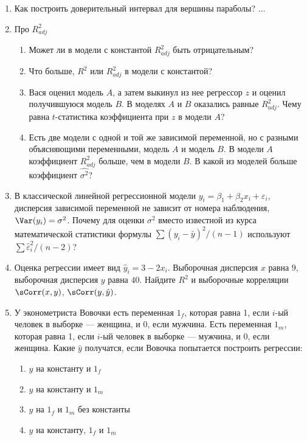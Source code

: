 \documentclass[pdftex,12pt,a4paper]{article}
\def \hy{\hat{y}}
\def \he{\hat{\varepsilon}}
\def \e{\varepsilon}
\newcommand{\solution}[1]{}
\begin{document}
\begin{enumerate}
\item Как построить доверительный интервал для вершины параболы? ...
\solution{bootstrap, дельта-метод}

\item Про $R^2_{adj}$
\begin{enumerate}
\item Может ли в модели с константой $R^2_{adj}$ быть отрицательным?
\item Что больше, $R^2$ или $R^2_{adj}$ в модели с константой?
\item Вася оценил модель $A$, а затем выкинул из нее регрессор $z$ и оценил получившуюся модель $B$. В моделях $A$ и $B$ оказались равные $R^2_{adj}$. Чему равна $t$-статистика коэффициента при $z$ в модели $A$?
\item Есть две модели с одной и той же зависимой переменной, но с разными объясняющими переменными, модель $A$ и модель $B$. В модели $A$ коэффициент $R^2_{adj}$ больше, чем в модели $B$. В какой из моделей больше коэффициент $\hat{\sigma^2}$? 
\end{enumerate}
\solution{да, $R^2$, $t=1$, $B$ }


\item В классической линейной регрессионной модели $y_i=\beta_1+\beta_2 x_i+\e_i$, дисперсия зависимой переменной не зависит от номера наблюдения, $\Var(y_i)=\sigma^2$. Почему для оценки $\sigma^2$ вместо известной из курса математической статистики формулы $\sum (y_i-\bar{y})^2/(n-1)$ используют $\sum \he_i^2/(n-2)$?
\solution{формула $\sum (y_i-\bar{y})^2/(n-1)$ неприменима так как $\E(y_i)$ не является константой }


\item Оценка регрессии имеет вид $\hy_i=3-2x_i$. Выборочная дисперсия $x$ равна $9$, выборочная дисперсия $y$ равна $40$. Найдите $R^2$ и выборочные корреляции $\sCorr(x,y)$, $\sCorr(y,\hy)$.
\solution{$R^2$ --- это отношение выборочных дисперсий $\hy$ и $y$. } 

\item У эконометриста Вовочки есть переменная $1_f$, которая равна 1, если $i$-ый человек в выборке --- женщина, и 0, если мужчина. Есть переменная $1_m$, которая равна 1, если $i$-ый человек в выборке --- мужчина, и 0, если женщина. Какие $\hy$ получатся, если Вовочка попытается построить регрессии:
\begin{enumerate}
\item $y$ на константу и $1_f$
\item $y$ на константу и $1_m$
\item $y$ на $1_f$ и $1_m$ без константы
\item $y$ на константу, $1_f$ и $1_m$
\end{enumerate}



\end{enumerate}
\end{document}
